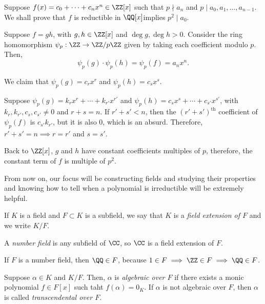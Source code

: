 
\begin{dem}
	Suppose $f(x) = c_0 + \cdots + c_nx^n \in \ZZ[x]$ such that $p \nmid a_n$ and $p \mid a_0, a_1, \dots, a_{n-1}$. We shall prove that $f$ is reductible in $\QQ[x]$implies $p^2 \mid a_0$.

	Suppose $f = gh$, with $g, h \in \ZZ[x]$ and $\deg g, \deg h > 0$.
	Consider the ring homomorphism $\psi_p: \ZZ \to \ZZ/p\ZZ$ given by taking each coefficient modulo $p$. Then, 
	\[ \psi_p(g)\cdot\psi_p(h) = \psi_p(f) = a_nx^n.\]

	We claim that $\psi_p(g) = c_rx^r$ and $\psi_p(h) = c_sx^s$. 

	Suppose $\psi_p(g) = k_rx^r + \cdots + k_{r'}x^{r'}$ and $\psi_p(h) = c_sx^s + \cdots + c_{s'}x^{s'}$, with $k_r, k_{r'}, c_s, c_{s'} \neq 0$ and $r + s = n$. If $r' + s' < n$, then the $(r' + s')^\mathrm{th}$ coefficient of  $\psi_p(f)$ is $c_{s'}k_{r'}$, but it is also  $0$, which is an absurd. Therefore, $r' + s' = n \implies r = r'$ and $s = s'$.

	Back to $\ZZ[x]$,  $g$ and $h$ have constant coefficients multiples of $p$, therefore, the constant term of $f$ is multiple of $p^2$. 
\end{dem}

From now on, our focus will be constructing fields and studying their properties and knowing how to tell when a polynomial is irreductible will be extremely helpful.

\begin{defn}
	If $K$ is a field and $F \subset K$ is a subfield, we say that $K$ is a \emph{field extension of $F$} and we write $K / F$.
\end{defn} 

\begin{exmp}
	A \emph{number field} is any subfield of $\CC$, so $\CC$ is a field extension of $F$. 

	If $F$ is a number field, then $\QQ \in F$, because $1 \in F \implies \ZZ \in F \implies \QQ \in F$.
\end{exmp}

\begin{defn}
	Suppose $\alpha \in K$ and $K / F$. Then, $\alpha$ is \emph{algebraic over $F$} if there exists a monic polynomial $f \in F[x]$ such taht  $f(\alpha) = 0_K$.
	If $\alpha$ is not algebraic over $F$, then $\alpha$ is called \emph{transcendental over $F$}.
\end{defn}

